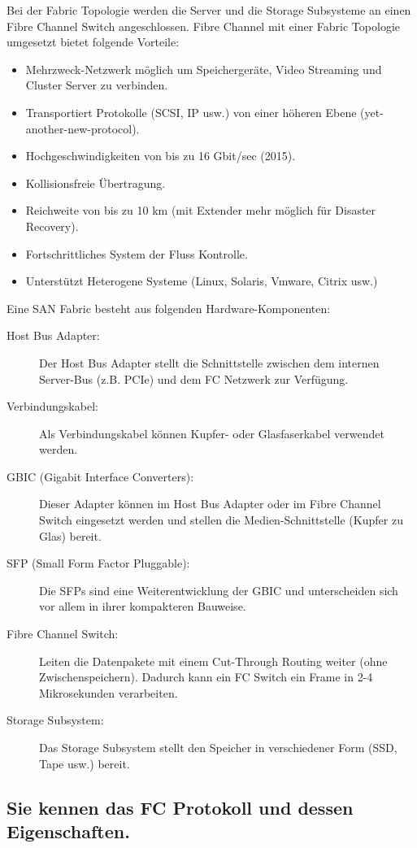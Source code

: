 Bei der Fabric Topologie werden die Server und die Storage Subsysteme an einen Fibre Channel Switch angeschlossen. Fibre Channel mit einer Fabric Topologie umgesetzt bietet folgende Vorteile:
\begin{itemize}
	\item Mehrzweck-Netzwerk möglich um Speichergeräte, Video Streaming und Cluster Server zu verbinden.
	\item Transportiert Protokolle (SCSI, IP usw.) von einer höheren Ebene (yet-another-new-protocol).
	\item Hochgeschwindigkeiten von bis zu 16 Gbit/sec (2015).
	\item Kollisionsfreie Übertragung.
	\item Reichweite von bis zu 10 km (mit Extender mehr möglich für Disaster Recovery).
	\item Fortschrittliches System der Fluss Kontrolle.
	\item Unterstützt Heterogene Systeme (Linux, Solaris, Vmware, Citrix usw.)
\end{itemize}
Eine SAN Fabric besteht aus folgenden Hardware-Komponenten:
\begin{description}
	\item[Host Bus Adapter:] Der Host Bus Adapter stellt die Schnittstelle zwischen dem internen Server-Bus (z.B. PCIe) und dem FC Netzwerk zur Verfügung.
	\item[Verbindungskabel:] Als Verbindungskabel können Kupfer- oder Glasfaserkabel verwendet werden.
	\item[GBIC (Gigabit Interface Converters):] Dieser Adapter können im Host Bus Adapter oder im Fibre Channel Switch eingesetzt werden und stellen die Medien-Schnittstelle (Kupfer zu Glas) bereit.
	\item[SFP (Small Form Factor Pluggable):] Die SFPs sind eine Weiterentwicklung der GBIC und unterscheiden sich vor allem in ihrer kompakteren Bauweise.
	\item[Fibre Channel Switch:] Leiten die Datenpakete mit einem Cut-Through Routing weiter (ohne Zwischenspeichern). Dadurch kann ein FC Switch ein Frame in 2-4 Mikrosekunden verarbeiten.
	\item[Storage Subsystem:] Das Storage Subsystem stellt den Speicher in verschiedener Form (SSD, Tape usw.) bereit.
\end{description}

\subsection{Sie kennen das FC Protokoll und dessen Eigenschaften.}

